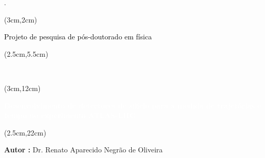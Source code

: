 \begin{titlepage}.
    

    \vspace{3.5cm}

    
    \begin{textblock*}{15cm}(3cm,2cm)
        \begin{Huge}
            \begin{center}
                \makeatletter
                \noindent\textcolor{black}{Projeto de pesquisa de pós-doutorado em física}
                \makeatother
            \end{center}
        \end{Huge}
    \end{textblock*}
    
    \begin{textblock*}{15cm}(2.5cm,5.5cm)
        \makeatletter
        \begin{LARGE}
            \begin{center}
                \color{black}
                {\it  }\\
            \end{center}
         \end{LARGE}
     
    \end{textblock*}
    
    \begin{textblock*}{15cm}(3cm,12cm)
        \begin{Huge}
            \begin{center}
                \makeatletter
                \noindent\textcolor{white}{\textbf{Desenvolvimento de detectores de silício para a medida de trajetórias e tempo no experimento ATLAS-LHC}}
                \makeatother
            \end{center}
        \end{Huge}
    \end{textblock*}

    \begin{textblock*}{15cm}(2.5cm,22cm)
        \begin{LARGE}
        \begin{center}
            \color{black}
                \textbf{Autor :} Dr. Renato Aparecido Negrão de Oliveira \\  \\ 
        \end{center}
            

\end{LARGE}
\end{textblock*}
\end{titlepage}
